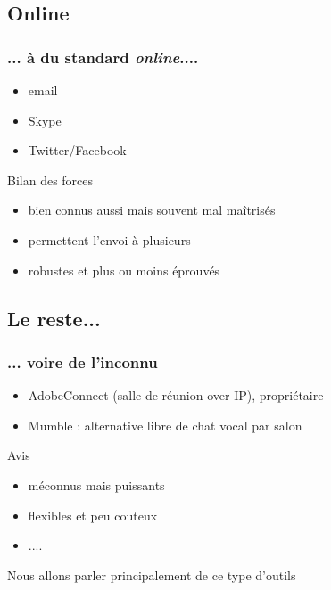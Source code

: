 \documentclass{beamer}
\begin{document}
\subsection{Online} %

\begin{frame}
    \frametitle{... à du standard \textit{online}....} 

    \begin{itemize}
        \item email
        \item Skype
        \item Twitter/Facebook
    \end{itemize}

    \pause{}

    \begin{block}{Bilan des forces}
        \begin{itemize}
            \item bien connus aussi mais souvent mal maîtrisés
            \item permettent l'envoi à plusieurs
            \item robustes et plus ou moins éprouvés
        \end{itemize}
    \end{block}
\end{frame}

\subsection{Le reste...} %

\begin{frame}
    \frametitle{... voire de l'inconnu}

    \begin{itemize}
        \item AdobeConnect (salle de réunion over IP), propriétaire
        \item Mumble : alternative libre de chat vocal par salon
    \end{itemize}

    \pause{}

    \begin{block}{Avis}
        \begin{itemize}
            \item méconnus mais puissants
            \item flexibles et peu couteux
            \item ....
        \end{itemize}

        \pause{}

        Nous allons parler principalement de ce type d'outils
    \end{block}
\end{frame}
\end{document}
